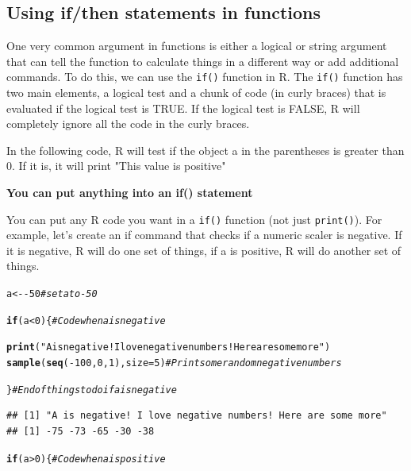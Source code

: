 \documentclass{tufte-book}\usepackage[]{graphicx}\usepackage[]{color}
\makeatletter
\newcommand{\hlnum}[1]{\textcolor[rgb]{0.686,0.059,0.569}{#1}}%
\newcommand{\hlstr}[1]{\textcolor[rgb]{0.192,0.494,0.8}{#1}}%
\newcommand{\hlcom}[1]{\textcolor[rgb]{0.678,0.584,0.686}{\textit{#1}}}%
\newcommand{\hlopt}[1]{\textcolor[rgb]{0,0,0}{#1}}%
\newcommand{\hlstd}[1]{\textcolor[rgb]{0.345,0.345,0.345}{#1}}%
\newcommand{\hlkwa}[1]{\textcolor[rgb]{0.161,0.373,0.58}{\textbf{#1}}}%
\newcommand{\hlkwb}[1]{\textcolor[rgb]{0.69,0.353,0.396}{#1}}%
\newcommand{\hlkwc}[1]{\textcolor[rgb]{0.333,0.667,0.333}{#1}}%
\newcommand{\hlkwd}[1]{\textcolor[rgb]{0.737,0.353,0.396}{\textbf{#1}}}%
\newenvironment{kframe}{%
 \def\at@end@of@kframe{}%
 \ifinner\ifhmode%
  \def\at@end@of@kframe{\end{minipage}}%
  \begin{minipage}{\columnwidth}%
 \fi\fi%
 \def\FrameCommand##1{\hskip\@totalleftmargin \hskip-\fboxsep
 \colorbox{shadecolor}{##1}\hskip-\fboxsep
     \hskip-\linewidth \hskip-\@totalleftmargin \hskip\columnwidth}%
 \MakeFramed {\advance\hsize-\width
   \@totalleftmargin\z@ \linewidth\hsize
   \@setminipage}}%
 {\par\unskip\endMakeFramed%
 \at@end@of@kframe}
\newenvironment{knitrout}{}{} %
\makeatother
\begin{document}
\begin{footnotesize}
\subsection{Using if/then statements in functions}

One very common argument in functions is either a logical or string argument that can tell the function to calculate things in a different way or add additional commands. To do this, we can use the \texttt{if()} function in R. The \texttt{if()} function has two main elements, a logical test and a chunk of code (in curly braces) that is evaluated if the logical test is TRUE. If the logical test is FALSE, R will completely ignore all the code in the curly braces.

In the following code, R will test if the object a in the parentheses is greater than 0. If it is, it will print "This value is positive"

\begin{marginfigure}
\textbf{You can put anything into an if(){} statement}

You can put any R code you want in a \texttt{if()} function (not just \texttt{print()}). For example, let's create an if command that checks if a numeric scaler is negative. If it is negative, R will do one set of things, if a is positive, R will do another set of things.

\begin{tiny}
\begin{knitrout}
\color{fgcolor}\begin{kframe}
\begin{alltt}
\hlstd{a} \hlkwb{<-} \hlopt{-}\hlnum{50}  \hlcom{# set a to -50}

\hlkwa{if}\hlstd{(a} \hlopt{<} \hlnum{0}\hlstd{) \{} \hlcom{# Code when a is negative}

 \hlkwd{print}\hlstd{(}\hlstr{"A is negative! I love negative numbers! Here are some more"}\hlstd{)}
 \hlkwd{sample}\hlstd{(}\hlkwd{seq}\hlstd{(}\hlopt{-}\hlnum{100}\hlstd{,} \hlnum{0}\hlstd{,} \hlnum{1}\hlstd{),} \hlkwc{size} \hlstd{=} \hlnum{5}\hlstd{)} \hlcom{# Print some random negative numbers}

\hlstd{\}} \hlcom{# End of things to do if a is negative}
\end{alltt}
\begin{verbatim}
## [1] "A is negative! I love negative numbers! Here are some more"
## [1] -75 -73 -65 -30 -38
\end{verbatim}
\begin{alltt}
\hlkwa{if}\hlstd{(a} \hlopt{>} \hlnum{0}\hlstd{) \{} \hlcom{# Code when a is positive}


\end{alltt}
\end{kframe}
\end{knitrout}
\end{tiny}
\end{marginfigure}
\end{footnotesize}
\end{document}

